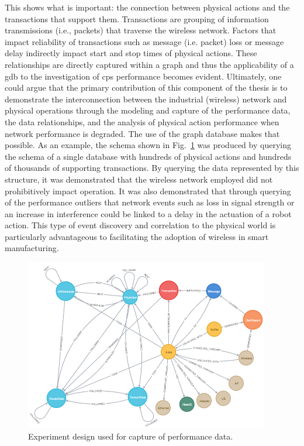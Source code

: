 This shows what is important: the connection between physical actions and the transactions that support them.  Transactions are grouping of information transmissions (i.e., packets) that traverse the wireless network.  Factors that impact reliability of transactions such as message (i.e. packet) loss or message delay indirectly impact start and stop times of physical actions.  These relationships are directly captured within a graph and thus the applicability of a \gls{gdb} to the investigation of \gls{cps} performance becomes evident.  Ultimately, one could argue that the primary contribution of this component of the thesis is to demonstrate the interconnection between the industrial (wireless) network and physical operations through the modeling and capture of the performance data, the data relationships, and the analysis of physical action performance when network performance is degraded.  The use of the graph database makes that possible.  As an example, the schema shown in Fig.~\ref{fig:concl:data-physical-actions-following} was produced by querying the schema of a single database with hundreds of physical actions and hundreds of thousands of supporting transactions.  By querying the data represented by this structure, it was demonstrated that the wireless network employed did not prohibitively impact operation.  It was also demonstrated that through querying of the performance outliers that network events such as loss in signal strength or an increase in interference could be linked to a delay in the actuation of a robot action.  This type of event discovery and correlation to the physical world is particularly advantageous to facilitating the adoption of wireless in smart manufacturing.

\begin{figure}[!ht]
	\centering
	\includegraphics[width=0.95\textwidth]{chapter-gdb-appl/figures/database/graph_schema_updated_2.png}
	\caption{Experiment design used for capture of performance data.}
	\label{fig:concl:data-physical-actions-following}
\end{figure}

